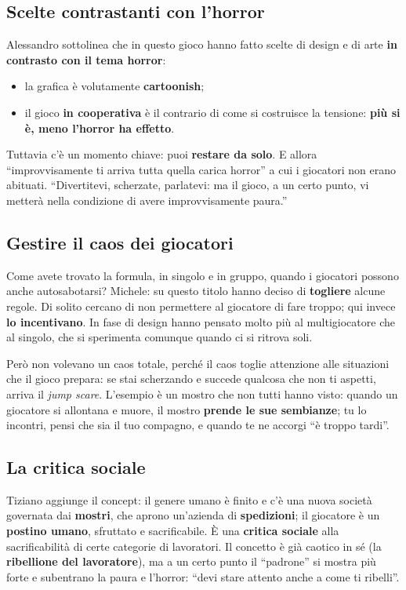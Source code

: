 \subsection{Scelte contrastanti con l'horror}

Alessandro sottolinea che in questo gioco hanno fatto scelte di design e di arte
\textbf{in contrasto con il tema horror}:
\begin{itemize}
  \item la grafica è volutamente \textbf{cartoonish};
  \item il gioco \textbf{in cooperativa} è il contrario di come si costruisce la
        tensione: \textbf{più si è, meno l'horror ha effetto}.
\end{itemize}
Tuttavia c'è un momento chiave: puoi \textbf{restare da solo}. E allora
``improvvisamente ti arriva tutta quella carica horror'' a cui i giocatori non
erano abituati. ``Divertitevi, scherzate, parlatevi: ma il gioco, a un certo
punto, vi metterà nella condizione di avere improvvisamente paura.''

\subsection{Gestire il caos dei giocatori}

Come avete trovato la formula, in singolo e in gruppo, quando i giocatori possono
anche autosabotarsi? Michele: su questo titolo hanno deciso di
\textbf{togliere} alcune regole. Di solito cercano di non permettere al giocatore
di fare troppo; qui invece \textbf{lo incentivano}. In fase di design hanno
pensato molto più al multigiocatore che al singolo, che si sperimenta comunque
quando ci si ritrova soli.

Però non volevano un caos totale, perché il caos toglie attenzione alle situazioni
che il gioco prepara: se stai scherzando e succede qualcosa che non ti aspetti,
arriva il \emph{jump scare}. L'esempio è un mostro che non tutti hanno visto:
quando un giocatore si allontana e muore, il mostro \textbf{prende le sue
sembianze}; tu lo incontri, pensi che sia il tuo compagno, e quando te ne accorgi
``è troppo tardi''.

\subsection{La critica sociale}

Tiziano aggiunge il concept: il genere umano è finito e c'è una nuova società
governata dai \textbf{mostri}, che aprono un'azienda di \textbf{spedizioni}; il
giocatore è un \textbf{postino umano}, sfruttato e sacrificabile. È una
\textbf{critica sociale} alla sacrificabilità di certe categorie di lavoratori.
Il concetto è già caotico in sé (la \textbf{ribellione del lavoratore}), ma a un
certo punto il ``padrone'' si mostra più forte e subentrano la paura e l'horror:
``devi stare attento anche a come ti ribelli''.

